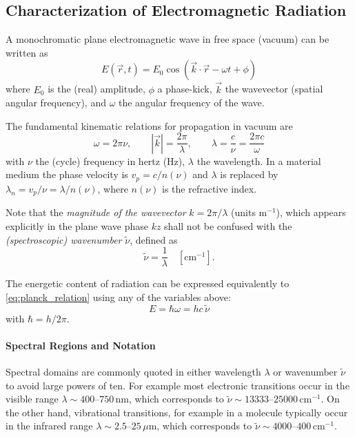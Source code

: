 \subsection{Characterization of Electromagnetic Radiation}
\label{subsec:em_radiation_characterization}

\noindent A monochromatic plane electromagnetic wave in free space (vacuum) can be written as
\begin{equation}
	E(\vec{r},t) = E_0 \cos(\vec{k} \cdot \vec{r} - \omega t + \phi)
	\label{eq:plane_wave}
\end{equation}
where $E_0$ is the (real) amplitude, $\phi$ a phase-kick, $\vec{k}$ the wavevector (spatial angular frequency), and $\omega$ the angular frequency of the wave.

The fundamental kinematic relations for propagation in vacuum are
\begin{equation}
	\omega = 2\pi\nu, \qquad |\vec{k}| = \frac{2\pi}{\lambda}, \qquad \lambda = \frac{c}{\nu} = \frac{2\pi c}{\omega}
	\label{eq:wavelength_frequency_relation}
\end{equation}
with $\nu$ the (cycle) frequency in hertz (Hz), $\lambda$ the wavelength. In a material medium the phase velocity is $v_p = c/n(\nu)$ and $\lambda$ is replaced by $\lambda_n = v_p/\nu = \lambda/n(\nu)$, where $n(\nu)$ is the refractive index.

\noindent Note that the \emph{magnitude of the wavevector } $k = 2\pi/\lambda$ (units m$^{-1}$), which appears explicitly in the plane wave phase $kz$ shall not be confused with the \emph{(spectroscopic) wavenumber} $\tilde{\nu}$, defined as
\begin{equation}
	\tilde{\nu} = \frac{1}{\lambda} \quad [\mathrm{cm}^{-1}].
	\label{eq:wavenumber_definition}
\end{equation}

The energetic content of radiation can be expressed equivalently to \eqref{eq:planck_relation} using any of the variables above:
\begin{equation}
	E = \hbar\omega = h c \, \tilde{\nu}
	\label{eq:energy_wavenumber_conversion}
\end{equation}
with $\hbar = h/2\pi$.



\paragraph{Spectral Regions and Notation}
\noindent Spectral domains are commonly quoted in either wavelength $\lambda$ or wavenumber $\tilde{\nu}$ to avoid large powers of ten.
For example most electronic transitions occur in the visible range $\lambda \sim 400$--$750\,\mathrm{nm}$, which corresponds to $\tilde{\nu} \sim 13333$--$25000\,\mathrm{cm}^{-1}$. On the other hand, vibrational transitions, for example in a molecule typically occur in the infrared range $\lambda \sim 2.5$--$25\,\mu\mathrm{m}$, which corresponds to $\tilde{\nu} \sim 4000$--$400\,\mathrm{cm}^{-1}$.

